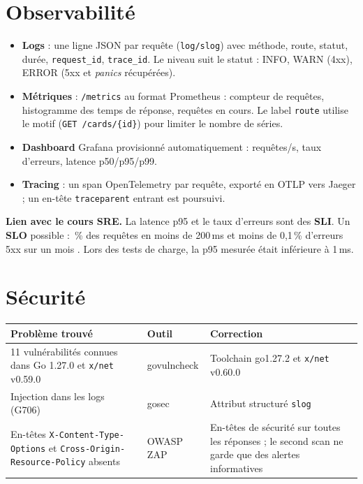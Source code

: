 \documentclass[11pt,a4paper]{article}
\newcommand{\code}[1]{\texttt{\small #1}}
\begin{document}
\section{Observabilité}
\begin{minipage}[t]{0.58\linewidth}
\begin{itemize}
  \item \textbf{Logs} : une ligne JSON par requête (\code{log/slog}) avec méthode, route, statut, durée,
        \code{request\_id}, \code{trace\_id}. Le niveau suit le statut : INFO, WARN (4xx), ERROR (5xx et
        \emph{panics} récupérées).
  \item \textbf{Métriques} : \code{/metrics} au format Prometheus : compteur de requêtes, histogramme des temps de
        réponse, requêtes en cours. Le label \code{route} utilise le motif (\code{GET /cards/\{id\}}) pour limiter
        le nombre de séries.
  \item \textbf{Dashboard} Grafana provisionné automatiquement : requêtes/s, taux d'erreurs, latence p50/p95/p99.
  \item \textbf{Tracing} : un span OpenTelemetry par requête, exporté en OTLP vers Jaeger ; un en-tête
        \code{traceparent} entrant est poursuivi.
\end{itemize}
\end{minipage}\hfill
\begin{minipage}[t]{0.38\linewidth}
\vspace{0pt}
\colorbox{tint}{\parbox{0.94\linewidth}{\small
\textbf{Lien avec le cours SRE.} La latence p95 et le taux d'erreurs sont des \textbf{SLI}. Un \textbf{SLO}
possible : \,\% des requêtes en moins de 200\,ms et moins de 0,1\,\% d'erreurs 5xx sur un mois \fg. Lors
des tests de charge, la p95 mesurée était inférieure à 1\,ms.}}
\end{minipage}

\section{Sécurité}
\begin{tabularx}{\linewidth}{@{}p{6.2cm}p{2.2cm}X@{}}
\toprule
\textbf{Problème trouvé} & \textbf{Outil} & \textbf{Correction} \\
\midrule
11 vulnérabilités connues dans Go 1.27.0 et \code{x/net} v0.59.0 & govulncheck & Toolchain go1.27.2 et \code{x/net} v0.60.0 \\
Injection dans les logs (G706) & gosec & Attribut structuré \code{slog} \\
En-têtes \code{X-Content-Type-Options} et \code{Cross-Origin-Resource-Policy} absents & OWASP ZAP & En-têtes de sécurité sur toutes les réponses ; le second scan ne garde que des alertes informatives \\
\bottomrule
\end{tabularx}
\end{document}

